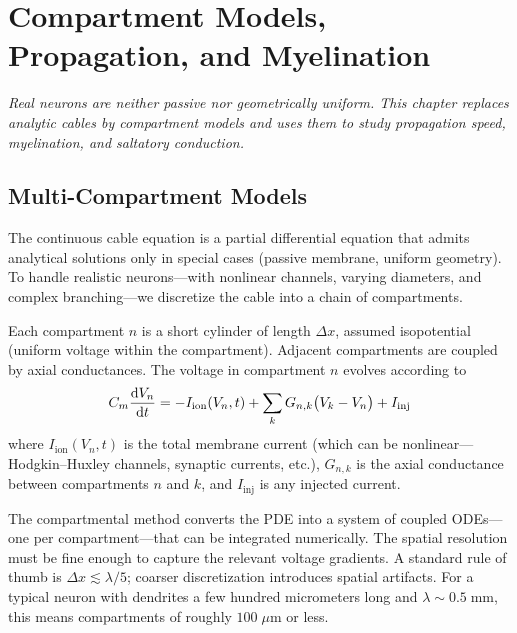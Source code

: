 \chapter{Compartment Models, Propagation, and Myelination}
\label{ch:compartments}

\textit{Real neurons are neither passive nor geometrically uniform. This chapter replaces analytic cables by compartment models and uses them to study propagation speed, myelination, and saltatory conduction.}

\section{Multi-Compartment Models}
\label{sec:compartments}

The continuous cable equation is a partial differential equation that admits analytical solutions only in special cases (passive membrane, uniform geometry). To handle realistic neurons---with nonlinear channels, varying diameters, and complex branching---we discretize the cable into a chain of compartments.

Each compartment $n$ is a short cylinder of length $\Delta x$, assumed isopotential (uniform voltage within the compartment). Adjacent compartments are coupled by axial conductances. The voltage in compartment $n$ evolves according to
%
\begin{equation}
  C_m\frac{\mathop{}\!\mathrm{d} V_n}{\mathop{}\!\mathrm{d} t} = -I_{\text{ion}}(V_n, t) + \sum_k G_{n,k}\bigl(V_k - V_n\bigr) + I_{\text{inj}}
  \label{eq:compartment}
\end{equation}
%
where $I_{\text{ion}}(V_n, t)$ is the total membrane current (which can be nonlinear---Hodgkin--Huxley channels, synaptic currents, etc.), $G_{n,k}$ is the axial conductance between compartments $n$ and $k$, and $I_{\text{inj}}$ is any injected current.

The compartmental method converts the PDE into a system of coupled ODEs---one per compartment---that can be integrated numerically. The spatial resolution must be fine enough to capture the relevant voltage gradients. A standard rule of thumb is $\Delta x \lesssim \lambda/5$; coarser discretization introduces spatial artifacts. For a typical neuron with dendrites a few hundred micrometers long and $\lambda \sim 0.5\;\text{mm}$, this means compartments of roughly $100\;\mu\text{m}$ or less.

